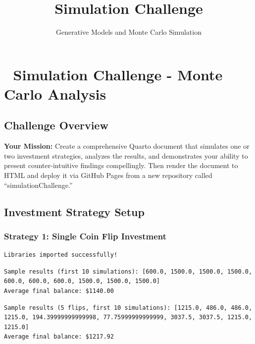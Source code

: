 \documentclass[
  letterpaper,
  DIV=11,
  numbers=noendperiod]{scrartcl}
\title{Simulation Challenge}
\subtitle{Generative Models and Monte Carlo Simulation}
\author{}
\date{}
\begin{document}
\maketitle


\section{🎲 Simulation Challenge - Monte Carlo
Analysis}\label{simulation-challenge---monte-carlo-analysis}

\subsection{Challenge Overview}\label{challenge-overview}

\textbf{Your Mission:} Create a comprehensive Quarto document that
simulates one or two investment strategies, analyzes the results, and
demonstrates your ability to present counter-intuitive findings
compellingly. Then render the document to HTML and deploy it via GitHub
Pages from a new repository called ``simulationChallenge.''

\subsection{Investment Strategy Setup}\label{investment-strategy-setup}

\subsubsection{Strategy 1: Single Coin Flip
Investment}\label{strategy-1-single-coin-flip-investment}

\label{setup-imports}
\begin{verbatim}
Libraries imported successfully!
\end{verbatim}

\label{strategy-1-single-flip}
\begin{verbatim}
Sample results (first 10 simulations): [600.0, 1500.0, 1500.0, 1500.0, 600.0, 600.0, 600.0, 1500.0, 1500.0, 1500.0]
Average final balance: $1140.00
\end{verbatim}

\label{strategy-2-multiple-flips}
\begin{verbatim}
Sample results (5 flips, first 10 simulations): [1215.0, 486.0, 486.0, 1215.0, 194.39999999999998, 77.75999999999999, 3037.5, 3037.5, 1215.0, 1215.0]
Average final balance: $1217.92
\end{verbatim}
\end{document}
